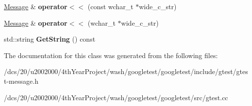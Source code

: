 \begin{DoxyCompactItemize}
\mbox{\hyperlink{classtesting_1_1Message}{Message}} \& {\bfseries operator$<$$<$} (const wchar\+\_\+t $\ast$wide\+\_\+c\+\_\+str)
\item 
\mbox{\label{classtesting_1_1Message_ac1d3a041ac4bb9c929ee746b31a13d6a}} 
\mbox{\hyperlink{classtesting_1_1Message}{Message}} \& {\bfseries operator$<$$<$} (wchar\+\_\+t $\ast$wide\+\_\+c\+\_\+str)
\item 
\mbox{\label{classtesting_1_1Message_a2cdc4df62bdcc9df37651a1cf527704e}} 
std\+::string {\bfseries Get\+String} () const
\end{DoxyCompactItemize}


The documentation for this class was generated from the following files\+:\begin{DoxyCompactItemize}
\item 
/dcs/20/u2002000/4th\+Year\+Project/wash/googletest/googletest/include/gtest/gtest-\/message.\+h\item 
/dcs/20/u2002000/4th\+Year\+Project/wash/googletest/googletest/src/gtest.\+cc\end{DoxyCompactItemize}
